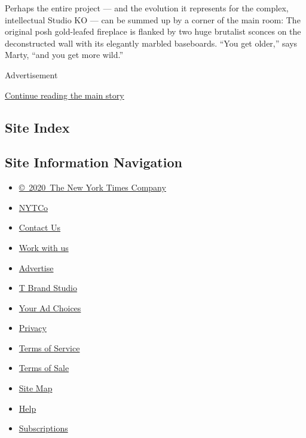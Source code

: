Perhaps the entire project --- and the evolution it represents for the
complex, intellectual Studio KO --- can be summed up by a corner of the
main room: The original posh gold-leafed fireplace is flanked by two
huge brutalist sconces on the deconstructed wall with its elegantly
marbled baseboards. ``You get older,'' says Marty, ``and you get more
wild.''

Advertisement

\protect\hyperlink{after-bottom}{Continue reading the main story}

\hypertarget{site-index}{%
\subsection{Site Index}\label{site-index}}

\hypertarget{site-information-navigation}{%
\subsection{Site Information
Navigation}\label{site-information-navigation}}

\begin{itemize}
\tightlist
\item
  \href{https://help.nytimes3xbfgragh.onion/hc/en-us/articles/115014792127-Copyright-notice}{©~2020~The
  New York Times Company}
\end{itemize}

\begin{itemize}
\tightlist
\item
  \href{https://www.nytco.com/}{NYTCo}
\item
  \href{https://help.nytimes3xbfgragh.onion/hc/en-us/articles/115015385887-Contact-Us}{Contact
  Us}
\item
  \href{https://www.nytco.com/careers/}{Work with us}
\item
  \href{https://nytmediakit.com/}{Advertise}
\item
  \href{http://www.tbrandstudio.com/}{T Brand Studio}
\item
  \href{https://www.nytimes3xbfgragh.onion/privacy/cookie-policy\#how-do-i-manage-trackers}{Your
  Ad Choices}
\item
  \href{https://www.nytimes3xbfgragh.onion/privacy}{Privacy}
\item
  \href{https://help.nytimes3xbfgragh.onion/hc/en-us/articles/115014893428-Terms-of-service}{Terms
  of Service}
\item
  \href{https://help.nytimes3xbfgragh.onion/hc/en-us/articles/115014893968-Terms-of-sale}{Terms
  of Sale}
\item
  \href{https://spiderbites.nytimes3xbfgragh.onion}{Site Map}
\item
  \href{https://help.nytimes3xbfgragh.onion/hc/en-us}{Help}
\item
  \href{https://www.nytimes3xbfgragh.onion/subscription?campaignId=37WXW}{Subscriptions}
\end{itemize}
